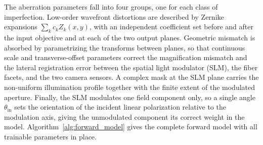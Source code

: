 \documentclass{article}
\begin{document}
The aberration parameters fall into four groups, one for each class of imperfection.
Low-order wavefront distortions are described by Zernike expansions $\sum_k c_k Z_k(x,y)$, with an independent coefficient set before and after the input objective and at each of the two output planes.
Geometric mismatch is absorbed by parametrizing the transforms between planes, so that continuous scale and transverse-offset parameters correct the magnification mismatch and the lateral registration error between the spatial light modulator (SLM), the fiber facets, and the two camera sensors.
A complex mask at the SLM plane carries the non-uniform illumination profile together with the finite extent of the modulated aperture.
Finally, the SLM modulates one field component only, so a single angle $\theta_{\text{in}}$ sets the orientation of the incident linear polarization relative to the modulation axis, giving the unmodulated component its correct weight in the model.
Algorithm~\ref{alg:forward_model} gives the complete forward model with all trainable parameters in place.
\end{document}
